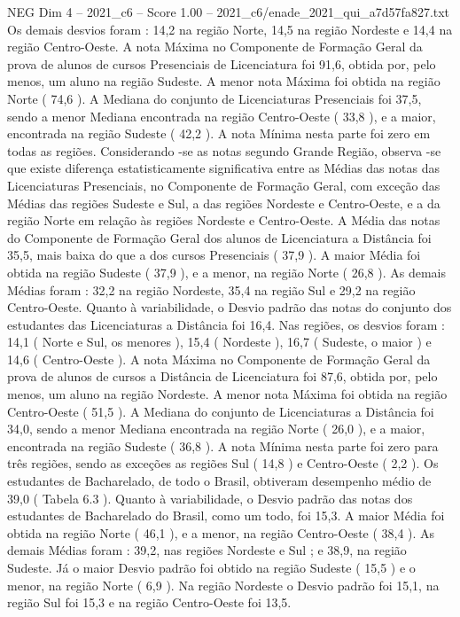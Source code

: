 \begin{textsample}{NEG Dim 4 – 2021\_c6 – Score 1.00 – 2021\_c6/enade\_2021\_qui\_a7d57fa827.txt}
Os demais desvios foram : 14,2 na região Norte, 14,5 na região Nordeste e 14,4 na região Centro-Oeste.
A nota Máxima no Componente de Formação Geral da prova de alunos de cursos Presenciais de Licenciatura foi 91,6, obtida por, pelo menos, um aluno na região Sudeste.
A menor nota Máxima foi obtida na região Norte ( 74,6 ).
A Mediana do conjunto de Licenciaturas Presenciais foi 37,5, sendo a menor Mediana encontrada na região Centro-Oeste ( 33,8 ), e a maior, encontrada na região Sudeste ( 42,2 ).
A nota Mínima nesta parte foi zero em todas as regiões.
Considerando -se as notas segundo Grande Região, observa -se que existe diferença estatisticamente significativa entre as Médias das notas das Licenciaturas Presenciais, no Componente de Formação Geral, com exceção das Médias das regiões Sudeste e Sul, a das regiões Nordeste e Centro-Oeste, e a da região Norte em relação às regiões Nordeste e Centro-Oeste.
A Média das notas do Componente de Formação Geral dos alunos de Licenciatura a Distância foi 35,5, mais baixa do que a dos cursos Presenciais ( 37,9 ).
A maior Média foi obtida na região Sudeste ( 37,9 ), e a menor, na região Norte ( 26,8 ).
As demais Médias foram : 32,2 na região Nordeste, 35,4 na região Sul e 29,2 na região Centro-Oeste.
Quanto à variabilidade, o Desvio padrão das notas do conjunto dos estudantes das Licenciaturas a Distância foi 16,4.
Nas regiões, os desvios foram : 14,1 ( Norte e Sul, os menores ), 15,4 ( Nordeste ), 16,7 ( Sudeste, o maior ) e 14,6 ( Centro-Oeste ).
A nota Máxima no Componente de Formação Geral da prova de alunos de cursos a Distância de Licenciatura foi 87,6, obtida por, pelo menos, um aluno na região Nordeste.
A menor nota Máxima foi obtida na região Centro-Oeste ( 51,5 ).
A Mediana do conjunto de Licenciaturas a Distância foi 34,0, sendo a menor Mediana encontrada na região Norte ( 26,0 ), e a maior, encontrada na região Sudeste ( 36,8 ).
A nota Mínima nesta parte foi zero para três regiões, sendo as exceções as regiões Sul ( 14,8 ) e Centro-Oeste ( 2,2 ).
Os estudantes de Bacharelado, de todo o Brasil, obtiveram desempenho médio de 39,0 ( Tabela 6.3 ).
Quanto à variabilidade, o Desvio padrão das notas dos estudantes de Bacharelado do Brasil, como um todo, foi 15,3.
A maior Média foi obtida na região Norte ( 46,1 ), e a menor, na região Centro-Oeste ( 38,4 ).
As demais Médias foram : 39,2, nas regiões Nordeste e Sul ; e 38,9, na região Sudeste.
Já o maior Desvio padrão foi obtido na região Sudeste ( 15,5 ) e o menor, na região Norte ( 6,9 ).
Na região Nordeste o Desvio padrão foi 15,1, na região Sul foi 15,3 e na região Centro-Oeste foi 13,5.

\end{textsample}
